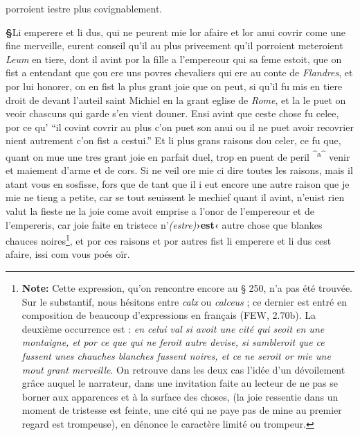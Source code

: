 \documentclass[12pt]{article} %
\newcommand{\persName}[1]{\emph{#1}} %
\newcommand{\placeName}[1]{\emph{#1}} %
\newcommand{\corr}[2]{\emph{(#1)}\textbf{›#2‹}} %
\newcommand{\add}[1]{\textsuperscript{#1}}       %
\newcommand{\supplied}[1]{\textlangle#1\textrangle} %
\newcommand{\fnnote}[1]{\footnote{\textbf{Note:} #1}} %
\newcounter{paranum}
\newcommand{\pnum}{\stepcounter{paranum}\textbf{§\arabic{paranum}}\quad}
\begin{document}
porroient iestre plus covignablement.


\pnum Li emperere et li dus, qui ne peurent mie lor afaire et lor anui covrir come une fine merveille, eurent conseil qu'il au plus priveement qu'il porroient meteroient \persName{Leum} en tiere, dont il avint por la fille a l'empereour qui sa feme estoit, que on fist a entendant que çou ere uns povres chevaliers qui ere au conte de \placeName{Flandres}, et por lui honorer, on en fist la plus grant joie que on peut, si qu'il fu mis en tiere droit de devant l'auteil saint Michiel en la grant eglise de \placeName{Rome}, et la le puet on veoir chascuns qui garde s'en vient douner. Ensi avint que ceste chose fu celee, por ce qu' ``il covint covrir au plus c'on puet son anui ou il ne puet avoir recovrier nient autrement c'on fist a cestui.'' Et li plus grans raisons dou celer, ce fu que, quant on mue une tres grant joie en parfait duel, trop en puent de peril \add{^a^} venir et maiement d'arme et de cors. Si ne veil ore mie ci dire toutes les raisons, mais il atant vous en sosfisse, fors que de tant que il i eut encore une autre raison que je mie ne tieng a petite, car se tout seuisse\supplied{n}t le mechief quant il avint, n'euist rien valut la fieste ne la joie come avoit emprise a l'onor de l'empereour et de l'empereris, car joie faite en tristece n'\corr{estre}{est} autre chose que blankes chauces noires\fnnote{Cette expression, qu'on rencontre encore au § 250, n'a pas été trouvée. Sur le substantif, nous hésitons entre \textit{calx} ou \textit{calceus} ; ce dernier est entré en composition de beaucoup d'expressions en français (FEW, 2.70b). La deuxième occurrence est : \textit{en celui val si avoit une cité qui seoit en une montaigne, et por ce que qui ne feroit autre devise, si sambleroit que ce fussent unes chauches blanches fussent noires, et ce ne seroit or mie une mout grant merveille}. On retrouve dans les deux cas l'idée d'un dévoilement grâce auquel le narrateur, dans une invitation faite au lecteur de ne pas se borner aux apparences et à la surface des choses, (la joie ressentie dans un moment de tristesse est feinte, une cité qui ne paye pas de mine au premier regard est trompeuse), en dénonce le caractère limité ou trompeur.}, et por ces raisons et por autres fist li emperere et li dus cest afaire, issi com vous poés oïr.
\end{document}
